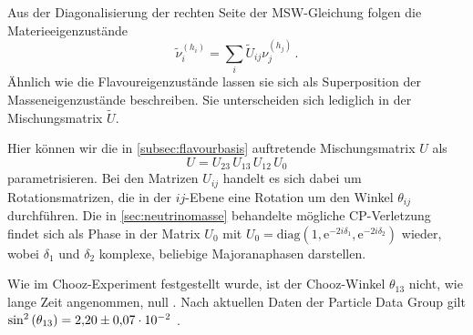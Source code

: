 Aus der Diagonalisierung der rechten Seite der MSW-Gleichung \cite{komponentendinger, PhysRevD.37.1935} folgen die Materieeigenzustände
\begin{equation}
    \tilde{\nu}^{(h_i)}_i = \sum_i \tilde{U}_{i j} \nu^{(h_j)}_j \,.
    \label{eq:materiebasis}
\end{equation} 
Ähnlich wie die Flavoureigenzustände lassen sie sich als Superposition der Masseneigenzustände beschreiben.
Sie unterscheiden sich lediglich in der Mischungsmatrix $\tilde{U}$.

Hier können wir die in \autoref{subsec:flavourbasis} auftretende Mischungsmatrix $U$ als
\begin{equation}
    U = U_{2 3} \, U_{1 3} \, U_{1 2} \, U_0
    \label{eq:kopplungflavour}
\end{equation}
parametrisieren.
Bei den Matrizen $U_{i j}$ handelt es sich dabei um Rotationsmatrizen, die in der $i j$-Ebene eine Rotation um den Winkel $\theta_{i j}$ durchführen.
Die in \autoref{sec:neutrinomasse} behandelte mögliche CP-Verletzung findet sich als Phase in der Matrix $U_0$ mit $U_0 = \text{diag}(1, \mathrm{e}^{-2 i \delta_1}, \mathrm{e}^{-2 i \delta_2})$ wieder, wobei
$\delta_1$ und $\delta_2$ komplexe, beliebige Majoranaphasen darstellen\cite{neutrinorotmat}.

Wie im Chooz-Experiment festgestellt wurde, ist der Chooz-Winkel $\theta_{1 3}$ nicht, wie lange Zeit angenommen, null \cite{theta13}.
Nach aktuellen Daten der Particle Data Group gilt $\sin^2 \left(\theta_{1 3} \right) = \num{2.20 +- 0.07} \cdot 10^{-2}$ \cite{neutrinospdg}.

